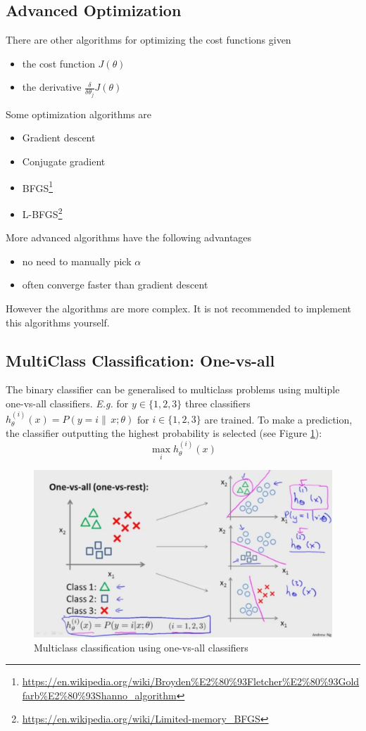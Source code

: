\documentclass[a4paper,twoside,10pt]{article}
\begin{document}
\subsection{Advanced Optimization}
There are other algorithms for optimizing the cost functions given
\begin{itemize}
  \item the cost function $J(\theta)$
  \item the derivative $\frac{\delta}{\delta\theta_j}J(\theta)$
\end{itemize}
Some optimization algorithms are
\begin{itemize}
  \item Gradient descent
  \item Conjugate gradient
  \item \acs{BFGS}\footnote{\url{https://en.wikipedia.org/wiki/Broyden\%E2\%80\%93Fletcher\%E2\%80\%93Goldfarb\%E2\%80\%93Shanno_algorithm}}
  \item \acs{L-BFGS}\footnote{\url{https://en.wikipedia.org/wiki/Limited-memory_BFGS}}
\end{itemize}
More advanced algorithms have the following advantages
\begin{itemize}
  \item no need to manually pick $\alpha$
  \item often converge faster than gradient descent
\end{itemize}
However the algorithms are more complex. It is not recommended to implement this algorithms yourself.

\subsection{MultiClass Classification: One-vs-all}
The binary classifier can be generalised to multiclass problems using multiple one-vs-all classifiers.
\emph{E.g.} for $y\in\{1,2,3\}$ three classifiers $h_\theta^{(i)}(x)=P(y=i\|\,x;\theta)$ for $i\in\{1,2,3\}$ are trained.
To make a prediction, the classifier outputting the highest probability is selected (see Figure \ref{fig:onevsall}):
\begin{equation*}
  \mathop{\operatorname{max}}_ih_\theta^{(i)}(x)
\end{equation*}
\begin{figure}[htbp]
  \begin{center}
    \includegraphics[width=.6\textwidth]{onevsall}
    \caption{Multiclass classification using one-vs-all classifiers\label{fig:onevsall}}
  \end{center}
\end{figure}
\end{document}
